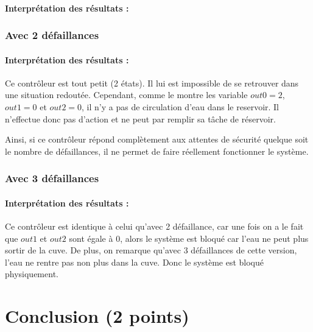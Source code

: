 \documentclass[a4paper]{book}
\begin{document}
\paragraph{Interprétation des résultats : }

\subsubsection{Avec 2 défaillances}

\paragraph{Interprétation des résultats :}
Ce contrôleur est tout petit (2 états). Il lui est impossible de se retrouver dans une situation redoutée. Cependant, comme le montre les variable $out0=2$, $out1=0$ et $out2=0$, il n'y a pas de circulation d'eau dans le reservoir.
Il n'effectue donc pas d'action et ne peut par remplir sa tâche de réservoir.

Ainsi, si ce contrôleur répond complètement aux attentes de sécurité quelque soit le nombre de défaillances, il ne permet de faire réellement fonctionner le système.


\subsubsection{Avec 3 défaillances}

\paragraph{Interprétation des résultats :}
Ce contrôleur est identique à celui qu'avec 2 défaillance, car une fois on a le fait que $out1$ et $out2$ sont égale à $0$, alors le système est bloqué car l'eau ne peut plus sortir de la cuve.
De plus, on remarque qu'avec 3 défaillances de cette version, l'eau ne rentre pas non plus dans la cuve. Donc le système est bloqué physiquement.

\section{Conclusion (2 points)}
\end{document}
